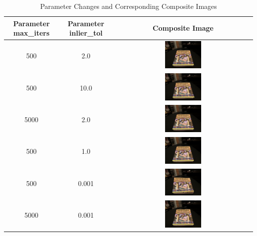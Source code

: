 \documentclass{article}
\begin{document}
	\begin{table}[H]
	\centering
	\begin{tabular}{|c|c|c|}
		\hline
		\textbf{Parameter max\_iters} & \textbf{Parameter inlier\_tol} & \textbf{Composite Image} \\
		\hline
		500 & 2.0 & \includegraphics[width=0.27\textwidth]{Q2_2_5_500_2.0.png} \\
		\hline
		500 & 10.0 & \includegraphics[width=0.27\textwidth]{Q2_2_5_500_10.0.png} \\						
		\hline
		5000 & 2.0 & \includegraphics[width=0.27\textwidth]{Q2_2_5_5000_2.0.png} \\
		\hline
		500 & 1.0 & \includegraphics[width=0.27\textwidth]{Q2_2_5_500_1.0.png} \\			
		\hline
		500 & 0.001 & \includegraphics[width=0.27\textwidth]{Q2_2_5_500_0.001.png} \\
		\hline
		5000 & 0.001 & \includegraphics[width=0.27\textwidth]{Q2_2_5_5000_0.001.png} \\
		\hline
	\end{tabular}
	\caption{Parameter Changes and Corresponding Composite Images}
	\label{table:composite}
	\end{table}	
	
\end{document}
